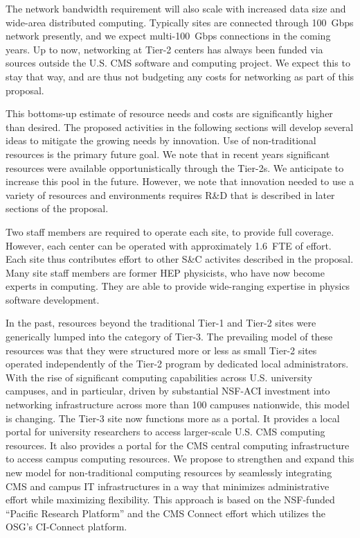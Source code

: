 \documentclass[11pt,a4paper]{article}
\begin{document}
The network bandwidth requirement will also scale with increased data size
and wide-area distributed computing.  Typically sites are connected through
100~Gbps network presently, and we expect multi-100~Gbps connections in the
coming years. Up to now, networking at Tier-2 centers has always been
funded via sources outside the U.S. CMS software and computing project. We
expect this to stay that way, and are thus not budgeting any costs for
networking as part of this proposal.

This bottoms-up estimate of resource needs and costs are significantly
higher than desired.  The proposed activities in the following sections
will develop several ideas to mitigate the growing needs by innovation.
Use of non-traditional resources is the primary future goal.  We note that
in recent years significant resources were available opportunistically
through the Tier-2s.  We anticipate to increase this pool in the future.
However, we note that innovation needed to use a variety of resources and
environments requires R\&D that is described in later sections of the proposal.

Two staff members are required to operate each site, to provide full
coverage.  However, each center can be operated with approximately 1.6~FTE
of effort.  Each site thus contributes effort to other S\&C activites
described in the proposal.  Many site staff members are former HEP
physicists, who have now become experts in computing. They are able to
provide wide-ranging expertise in physics software development.


In the past, resources beyond the traditional Tier-1 and Tier-2 sites were
generically lumped into the category of Tier-3.  The prevailing model of
these resources was that they were structured more or less as small Tier-2
sites operated independently of the Tier-2 program by dedicated local
administrators.  With the rise of significant computing capabilities across
U.S. university campuses, and in particular, driven by substantial NSF-ACI
investment into networking infrastructure across more than 100 campuses
nationwide, this model is changing.  The Tier-3 site now functions more as
a portal.  It provides a local portal for university researchers to access
larger-scale U.S. CMS computing resources.  It also provides a portal for the
CMS central computing infrastructure to access campus computing resources.
We propose to strengthen and expand this new model for non-traditional
computing resources by seamlessly integrating CMS and campus IT
infrastructures in a way that minimizes administrative effort while
maximizing flexibility.  This approach is based on the NSF-funded ``Pacific
Research Platform'' and the CMS Connect effort which utilizes the OSG's
CI-Connect platform.
\end{document}
